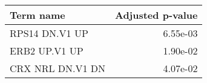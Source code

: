 \begin{tabular}{lr}
\toprule
       Term name &  Adjusted p-value \\
\midrule
  RPS14 DN.V1 UP &          6.55e-03 \\
   ERB2 UP.V1 UP &          1.90e-02 \\
CRX NRL DN.V1 DN &          4.07e-02 \\
\bottomrule
\end{tabular}
